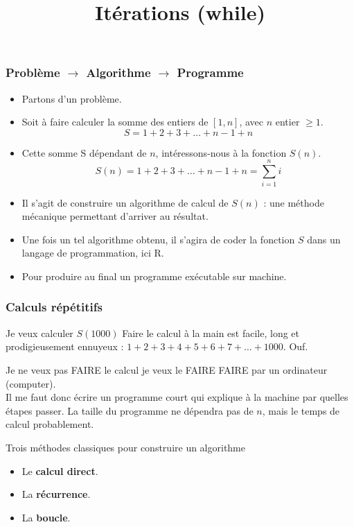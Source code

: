 \documentclass[10pt]{beamer}
\title{Itérations (while)}
\begin{document}
\maketitle

\begin{frame}
  \frametitle{Problème $\rightarrow$ Algorithme $\rightarrow$ Programme}

  
  \begin{itemize}
  \item Partons d'un \alert{problème}.
  \item Soit à faire calculer la somme des entiers de $[1,n]$, avec $n$ entier $\geq 1$.
    \[
      S = 1 + 2 + 3 + \ldots + n-1 + n
    \]
  \item Cette somme S dépendant de $n$, intéressons-nous à la fonction $S(n)$.
    \[
      S(n) = 1 + 2 + 3 + \ldots + n-1 + n = \sum_{i=1}^n i
    \]
  \item Il s'agit de construire un \alert{algorithme} de calcul de $S(n)$ : une \alert{méthode mécanique} permettant d'arriver au résultat.
  \item Une fois un tel algorithme obtenu, il s'agira de coder la fonction $S$ dans un langage de programmation, ici R.
  \item Pour produire au final un \alert{programme exécutable} sur machine.
  \end{itemize}

\end{frame}

\begin{frame}
  \frametitle{Calculs répétitifs}

  \begin{block}{Je veux calculer $S(1000)$}
    Faire le calcul à la main est facile, long et prodigieusement ennuyeux : $1 + 2 + 3 + 4 + 5 + 6 +7 + \ldots + 1000$. Ouf.
  \end{block}
  
  \begin{block}{Je ne veux pas FAIRE le calcul}
    je veux le FAIRE FAIRE par un ordinateur (computer). \\
    Il me faut donc écrire un programme court qui explique à la machine par quelles étapes passer. 
    La taille du programme ne dépendra pas de $n$, mais le temps de calcul probablement.
  \end{block}
  
  \begin{alertblock}{Trois méthodes classiques pour construire un algorithme}
    \begin{itemize}
    \item Le \alert{\textbf{calcul direct}}.
    \item La \alert{\textbf{récurrence}}.
    \item La \alert{\textbf{boucle}}.
    \end{itemize}
  \end{alertblock}
\end{frame}
\end{document}
